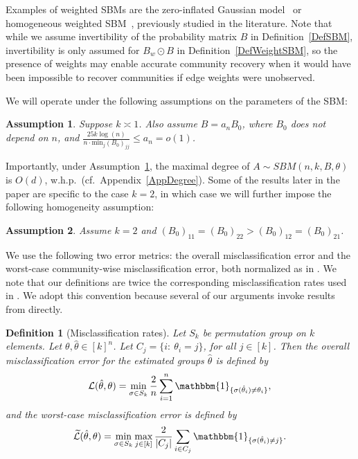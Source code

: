 \documentclass{article}
\newtheorem{definition}{Definition}
\newtheorem{assumption}{Assumption}
\newcommand{\thetahat}{\ensuremath{\widehat{\theta}}}
\begin{document}
Examples of weighted SBMs are the zero-inflated Gaussian model~\cite{oliveira2025counting} or homogeneous weighted SBM~\cite{xu2020optimal}, previously studied in the literature. Note that while we assume invertibility of the probability matrix $B$ in Definition~\ref{DefSBM}, invertibility is only assumed for $B_w \odot B$ in Definition~\ref{DefWeightSBM}, so the presence of weights may enable accurate community recovery when it would have been impossible to recover communities if edge weights were unobserved.

We will operate under the following assumptions on the parameters of the SBM:

\begin{assumption}\label{AssSBM}
Suppose $k \asymp 1$. Also assume $B = a_n B_0$, where $B_0$ does not depend on $n$, and $\frac{25k\log(n)}{n\cdot \mathrm{min}_j(B_0)_{jj}} \le a_n = o(1)$.
\end{assumption}

Importantly, under Assumption~\ref{AssSBM}, the maximal degree of $A \sim SBM(n,k,B,\theta)$ is $O(d)$, w.h.p.\ (cf.\ Appendix~\ref{AppDegree}).
Some of the results later in the paper are specific to the case $k=2$, in which case we will further impose the following homogeneity assumption:

\begin{assumption}
\label{assump_same_B11B22}
Assume $k = 2$ and $(B_0)_{11} = (B_0)_{22} > (B_0)_{12} = (B_0)_{21}$.
\end{assumption}

We use the following two error metrics: the overall misclassification error and the
worst-case community-wise misclassification error, both normalized as in
\cite{LeiRin15}. We note that our definitions are twice the corresponding misclassification
rates used in \cite{HehEtal22}. We adopt this convention because several of our
arguments invoke results from \cite{LeiRin15} directly.

\begin{definition}
[Misclassification rates]
\label{DefLoss}
Let $S_k$ be permutation group on $k$ elements. Let $\theta, \thetahat \in [k]^n$. Let $C_j = \{i: \ \theta_i = j\}$, for all $j \in [k]$. Then the overall misclassification error for the estimated groups $\hat{\theta}$ is defined by
\begin{align*}
\mathcal{L}(\hat{\theta}, \theta) = \mathop{\min}\limits_{\sigma \in S_k}\frac{2}{n}\sum_{i = 1}^n\mathbbm{1}_{\{\sigma(\hat{\theta}_i) \neq \theta_i\}},
\end{align*}
and the worst-case misclassification error is defined by
\begin{align*}
\widetilde{\mathcal{L}}(\hat{\theta}, \theta) = \mathop{\min}\limits_{\sigma \in S_k}\mathop{\max}_{j \in [k]}\frac{2}{|C_j|}\sum_{i \in C_j}\mathbbm{1}_{\{\sigma(\hat{\theta}_i) \neq j\}}.
\end{align*}
\end{definition}
\end{document}
